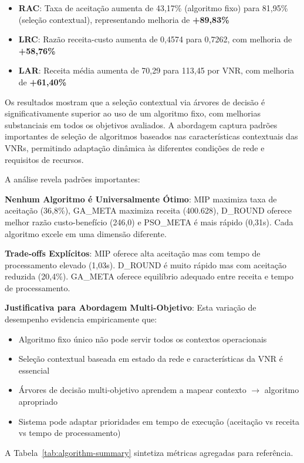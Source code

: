 \documentclass[conference]{IEEEtran}
\begin{document}
\begin{itemize}
    \item \textbf{RAC}: Taxa de aceitação aumenta de 43,17\% (algoritmo fixo) para 81,95\% (seleção contextual), representando melhoria de \textbf{+89,83\%}
    \item \textbf{LRC}: Razão receita-custo aumenta de 0,4574 para 0,7262, com melhoria de \textbf{+58,76\%}
    \item \textbf{LAR}: Receita média aumenta de 70,29 para 113,45 por VNR, com melhoria de \textbf{+61,40\%}
\end{itemize}

Os resultados mostram que a seleção contextual via árvores de decisão é significativamente superior ao uso de um algoritmo fixo, com melhorias substanciais em todos os objetivos avaliados. A abordagem captura padrões importantes de seleção de algoritmos baseados nas características contextuais das VNRs, permitindo adaptação dinâmica às diferentes condições de rede e requisitos de recursos.

A análise revela padrões importantes:

\textbf{Nenhum Algoritmo é Universalmente Ótimo}: MIP maximiza taxa de aceitação (36,8\%), GA\_META maximiza receita (400.628), D\_ROUND oferece melhor razão custo-benefício (246,0) e PSO\_META é mais rápido (0,31s). Cada algoritmo excele em uma dimensão diferente.

\textbf{Trade-offs Explícitos}: MIP oferece alta aceitação mas com tempo de processamento elevado (1,03s). D\_ROUND é muito rápido mas com aceitação reduzida (20,4\%). GA\_META oferece equilíbrio adequado entre receita e tempo de processamento.

\textbf{Justificativa para Abordagem Multi-Objetivo}: Esta variação de desempenho evidencia empiricamente que:
\begin{itemize}
    \item Algoritmo fixo único não pode servir todos os contextos operacionais
    \item Seleção contextual baseada em estado da rede e características da VNR é essencial
    \item Árvores de decisão multi-objetivo aprendem a mapear contexto $\rightarrow$ algoritmo apropriado
    \item Sistema pode adaptar prioridades em tempo de execução (aceitação vs receita vs tempo de processamento)
\end{itemize}

A Tabela~\ref{tab:algorithm-summary} sintetiza métricas agregadas para referência.
\end{document}
